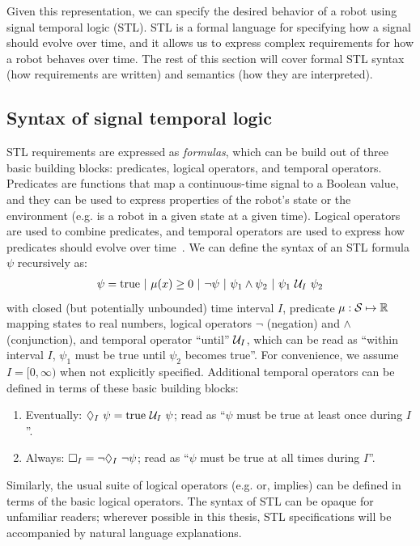 Given this representation, we can specify the desired behavior of a robot using signal temporal logic (STL). STL is a formal language for specifying how a signal should evolve over time, and it allows us to express complex requirements for how a robot behaves over time. The rest of this section will cover formal STL syntax (how requirements are written) and semantics (how they are interpreted).

\subsection{Syntax of signal temporal logic}

STL requirements are expressed as \textit{formulas}, which can be build out of three basic building blocks: predicates, logical operators, and temporal operators. Predicates are functions that map a continuous-time signal to a Boolean value, and they can be used to express properties of the robot's state or the environment (e.g. is a robot in a given state at a given time). Logical operators are used to combine predicates, and temporal operators are used to express how predicates should evolve over time~\cite{donzeEfficientRobustMonitoring2013a}. We can define the syntax of an STL formula $\psi$ recursively as:
\begin{align}
    \psi = \text{true}\ |\ \mu(x) \geq 0\ |\ \neg \psi\ |\ \psi_1 \wedge \psi_2\ |\ \psi_1 \ \mathcal{U}_I\ \psi_2\label{ch:iros:stl_syntax}
\end{align}
with closed (but potentially unbounded) time interval $I$, predicate $\mu: \mathcal{S} \mapsto \mathbb{R}$ mapping states to real numbers, logical operators $\neg$ (negation) and $\wedge$ (conjunction), and temporal operator ``until'' $\mathcal{U}_I$, which can be read as ``within interval $I$, $\psi_1$ must be true until $\psi_2$ becomes true''. For convenience, we assume $I = [0, \infty)$ when not explicitly specified. Additional temporal operators can be defined in terms of these basic building blocks:
\begin{enumerate}
    \item Eventually: $\lozenge_I\ \psi = \text{true } \mathcal{U}_I\ \psi$; read as ``$\psi$ must be true at least once during $I$''.
    \item Always: $\square_I = \neg \lozenge_I\ \neg \psi$; read as ``$\psi$ must be true at all times during $I$''.
\end{enumerate}
Similarly, the usual suite of logical operators (e.g. or, implies) can be defined in terms of the basic logical operators. The syntax of STL can be opaque for unfamiliar readers; wherever possible in this thesis, STL specifications will be accompanied by natural language explanations.

